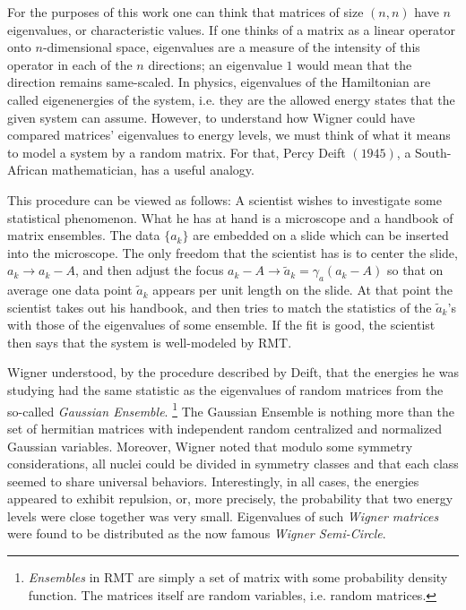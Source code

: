 For the purposes of this work one can think that matrices of size $(n,n)$ have $n$ eigenvalues, or characteristic values. If one thinks of a matrix as a linear operator onto $n$-dimensional space, eigenvalues are a measure of the intensity of this operator in each of the $n$ directions; an eigenvalue $1$ would mean that the direction remains same-scaled. In physics, eigenvalues of the Hamiltonian are called eigenenergies of the system, i.e. they are the allowed energy states that the given system can assume. However, to understand how Wigner could have compared matrices' eigenvalues to energy levels, we must think of what it means to model a system by a random matrix. For that, Percy Deift $(1945)$, a South-African mathematician, has a useful analogy.

\begin{citacao}[english]
	This procedure can be viewed as follows: A scientist wishes to investigate some statistical phenomenon. What he has at hand is a microscope and a handbook of matrix ensembles. The data $\{a_k\}$ are embedded on a slide which can be inserted into the microscope. The only freedom that the scientist has is to center the slide, $a_k \rightarrow a_k - A$, and then adjust the focus $a_k - A \rightarrow \tilde{a}_k = \gamma_a(a_k - A)$ so that on average one data point $\tilde{a}_k$ appears per unit length on the slide. At that point the scientist takes out his handbook, and then tries to match the statistics of the $\tilde{a}_k$’s with those of the eigenvalues of some ensemble. If the fit is good, the scientist then says that the system is well-modeled by RMT. \cite{deift2006universalitymathematicalphysicalsystems}
\end{citacao}

Wigner understood, by the procedure described by Deift, that the energies he was studying had the same statistic as the eigenvalues of random matrices from the so-called \textit{Gaussian Ensemble}. \footnote{\textit{Ensembles} in RMT are simply a set of matrix with some probability density function. The matrices itself are random variables, i.e. random matrices.} The Gaussian Ensemble is nothing more than the set of hermitian matrices with independent random centralized and normalized Gaussian variables. Moreover, Wigner noted that modulo some symmetry considerations, all nuclei could be divided in symmetry classes and that each class seemed to share universal behaviors. Interestingly, in all cases, the energies appeared to exhibit repulsion, or, more precisely, the probability that two energy levels were close together was very small. Eigenvalues of such \textit{Wigner matrices} were found to be distributed as the now famous \textit{Wigner Semi-Circle}.

